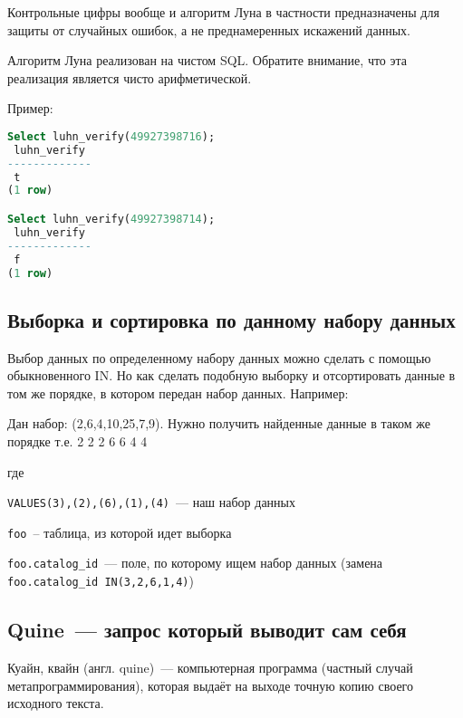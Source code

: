 Контрольные цифры вообще и алгоритм Луна в частности предназначены для защиты от случайных ошибок, а не преднамеренных искажений данных.

Алгоритм Луна реализован на чистом SQL. Обратите внимание, что эта реализация является чисто арифметической.



Пример:

\begin{lstlisting}[language=SQL,label=lst:snippets11,caption=Алгоритм Луна. Пример]
Select luhn_verify(49927398716);
 luhn_verify
-------------
 t
(1 row)

Select luhn_verify(49927398714);
 luhn_verify
-------------
 f
(1 row)

\end{lstlisting}

\subsection{Выборка и сортировка по данному набору данных}
Выбор данных по определенному набору данных можно сделать с помощью обыкновенного IN. Но как сделать подобную выборку и отсортировать
данные в том же порядке, в котором передан набор данных. Например:

Дан набор: (2,6,4,10,25,7,9). Нужно получить найденные данные в таком же порядке т.е. 2 2 2 6 6 4 4



где

\lstinline!VALUES(3),(2),(6),(1),(4)!~--- наш набор данных

\lstinline!foo!~-- таблица, из которой идет выборка

\lstinline!foo.catalog_id!~--- поле, по которому ищем набор данных (замена \lstinline!foo.catalog_id IN(3,2,6,1,4)!)

\subsection{Quine~--- запрос который выводит сам себя}
Куайн, квайн (англ. quine)~--- компьютерная программа (частный случай метапрограммирования), которая выдаёт на выходе точную копию своего исходного текста.



